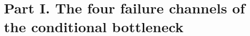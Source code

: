 %

\newtheorem{lemma}{Lemma}
\newtheorem{proposition}{Proposition}
\newtheorem{remark}{Remark}

\section*{Part I. The four failure channels of the conditional bottleneck}

